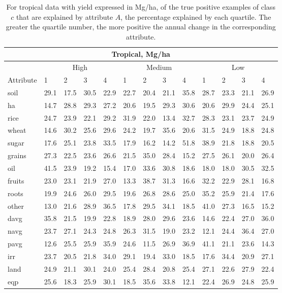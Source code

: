 \documentclass[12pt,twoside]{article}
\begin{document}
\begin{table}
\centering
\begin{tabular}{lllllllllllll}
\toprule
\multicolumn{13}{c}{\textbf{Tropical, Mg/ha}} \\
\midrule
& \multicolumn{4}{c}{High} & \multicolumn{4}{c}{Medium} & \multicolumn{4}{c}{Low} \\
\cmidrule(lr){2-5}
\cmidrule(lr){6-9}
\cmidrule(l){10-13}
Attribute & 1 & 2 & 3 & 4 & 1 & 2 & 3 & 4 & 1 & 2 & 3 & 4 \\
\midrule
soil & 29.1 & 17.5 & 30.5 & 22.9 & 22.7 & 20.4 & 21.1 & 35.8 & 28.7 & 23.3 & 21.1 & 26.9 \\
ha & 14.7 & 28.8 & 29.3 & 27.2 & 20.6 & 19.5 & 29.3 & 30.6 & 20.6 & 29.9 & 24.4 & 25.1 \\
rice & 24.7 & 23.9 & 22.1 & 29.2 & 31.9 & 22.0 & 13.4 & 32.7 & 28.3 & 23.1 & 23.7 & 24.9 \\
wheat & 14.6 & 30.2 & 25.6 & 29.6 & 24.2 & 19.7 & 35.6 & 20.6 & 31.5 & 24.9 & 18.8 & 24.8 \\
sugar & 17.6 & 25.1 & 23.8 & 33.5 & 17.9 & 16.2 & 14.2 & 51.8 & 38.9 & 21.8 & 18.8 & 20.5 \\
grains & 27.3 & 22.5 & 23.6 & 26.6 & 21.5 & 35.0 & 28.4 & 15.2 & 27.5 & 26.1 & 20.0 & 26.4 \\
oil & 41.5 & 23.9 & 19.2 & 15.4 & 17.0 & 33.6 & 30.8 & 18.6 & 18.0 & 18.0 & 30.5 & 32.5 \\
fruits & 23.0 & 23.1 & 21.9 & 27.0 & 13.3 & 38.7 & 31.3 & 16.6 & 32.2 & 22.9 & 28.1 & 16.8 \\
roots & 19.9 & 24.6 & 26.0 & 29.5 & 19.6 & 26.8 & 28.6 & 25.0 & 35.2 & 25.9 & 21.4 & 17.6 \\
other & 13.0 & 21.6 & 28.9 & 36.5 & 17.8 & 29.5 & 34.1 & 18.5 & 41.0 & 27.3 & 16.5 & 15.2 \\
davg & 35.8 & 21.5 & 19.9 & 22.8 & 18.9 & 28.0 & 29.6 & 23.6 & 14.6 & 22.4 & 27.0 & 36.0 \\
navg & 23.7 & 27.1 & 24.3 & 24.8 & 26.3 & 31.5 & 19.0 & 23.2 & 12.1 & 24.4 & 36.4 & 27.0 \\
pavg & 12.6 & 25.5 & 25.9 & 35.9 & 24.6 & 11.5 & 26.9 & 36.9 & 41.1 & 21.1 & 23.6 & 14.3 \\
irr & 23.7 & 20.5 & 21.8 & 34.0 & 29.1 & 19.4 & 33.0 & 18.5 & 17.6 & 34.4 & 20.9 & 27.1 \\
land & 24.9 & 21.1 & 30.1 & 24.0 & 25.4 & 28.4 & 20.8 & 25.4 & 27.1 & 22.6 & 27.9 & 22.4 \\
eqp & 25.6 & 18.3 & 25.9 & 30.1 & 18.5 & 35.6 & 33.8 & 12.1 & 22.4 & 26.9 & 24.8 & 25.9 \\
\bottomrule
\end{tabular}
\captionsetup{width=.7\textwidth}
\caption[Percentage of Examples Explained by Quartile (Tropical, Mg/ha)]{For tropical data with yield expressed in Mg/ha, of the true positive examples of class $c$ that are explained by attribute $A$, the percentage explained by each quartile. The greater the quartile number, the more positive the annual change in the corresponding attribute.}
\label{t.ny.trop.quartiles}
\end{table}
\end{document}
